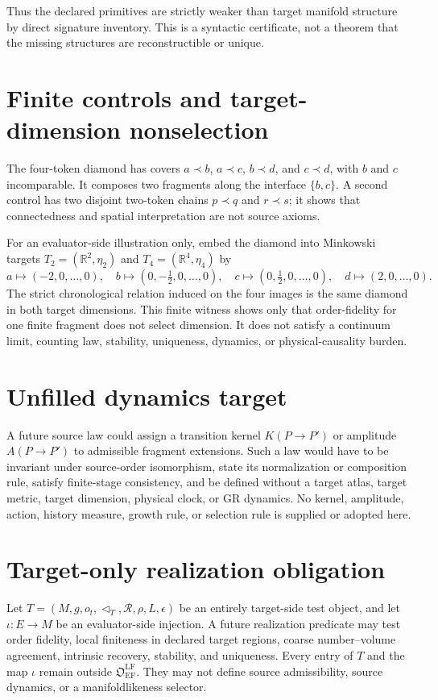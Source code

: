 \documentclass[11pt]{article}
\begin{document}
Thus the declared primitives are strictly weaker than target manifold
structure by direct signature inventory. This is a syntactic certificate, not
a theorem that the missing structures are reconstructible or unique.

\section{Finite controls and target-dimension nonselection}

The four-token diamond has covers
$a\prec b$, $a\prec c$, $b\prec d$, and $c\prec d$, with $b$ and $c$
incomparable. It composes two fragments along the interface $\{b,c\}$.
A second control has two disjoint two-token chains $p\prec q$ and
$r\prec s$; it shows that connectedness and spatial interpretation are not
source axioms.

For an evaluator-side illustration only, embed the diamond into Minkowski
targets $T_2=(\mathbb R^2,\eta_2)$ and $T_4=(\mathbb R^4,\eta_4)$ by
\[
 a\mapsto(-2,0,\ldots,0),\quad
 b\mapsto(0,-\tfrac12,0,\ldots,0),\quad
 c\mapsto(0,\tfrac12,0,\ldots,0),\quad
 d\mapsto(2,0,\ldots,0).
\]
The strict chronological relation induced on the four images is the same
diamond in both target dimensions. This finite witness shows only that
order-fidelity for one finite fragment does not select dimension. It does not
satisfy a continuum limit, counting law, stability, uniqueness, dynamics, or
physical-causality burden.

\section{Unfilled dynamics target}

A future source law could assign a transition kernel $K(P\to P')$ or amplitude
$A(P\to P')$ to admissible fragment extensions. Such a law would have to be
invariant under source-order isomorphism, state its normalization or
composition rule, satisfy finite-stage consistency, and be defined without a
target atlas, target metric, target dimension, physical clock, or GR dynamics.
No kernel, amplitude, action, history measure, growth rule, or selection rule
is supplied or adopted here.

\section{Target-only realization obligation}

Let $T=(M,g,o_t,\triangleleft_T,\mathcal R,\rho,L,\epsilon)$ be an entirely
target-side test object, and let $\iota:E\to M$ be an evaluator-side injection.
A future realization predicate may test order fidelity, local finiteness in
declared target regions, coarse number--volume agreement, intrinsic recovery,
stability, and uniqueness. Every entry of $T$ and the map $\iota$ remain
outside $\mathfrak O_{\mathrm{EF}}^{\mathrm{LF}}$. They may not define source
admissibility, source dynamics, or a manifoldlikeness selector.
\end{document}
